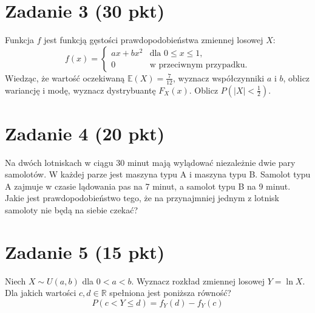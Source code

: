 \documentclass[polish, 10pt]{extarticle}
\begin{document}
\section*{Zadanie 3 (30 pkt)}
Funkcja $f$ jest funkcją gęstości prawdopodobieństwa zmiennej losowej $X$:
\[
f(x) = 
\begin{cases} 
ax + bx^2 & \text{dla } 0 \leq x \leq 1, \\
0 & \text{w przeciwnym przypadku}.
\end{cases}
\]
Wiedząc, że wartość oczekiwaną $\mathbb{E}(X) = \frac{7}{12}$, wyznacz współczynniki $a$ i $b$, oblicz wariancję i modę, wyznacz dystrybuantę $F_X(x)$. Oblicz $P(|X| < \frac{1}{2})$.


\section*{Zadanie 4 (20 pkt)}
Na dwóch lotniskach w ciągu 30 minut mają wylądować niezależnie
dwie pary samolotów. W każdej parze jest maszyna typu A i maszyna typu B.
Samolot typu A zajmuje w czasie lądowania pas na 7 minut, a samolot typu B
na 9 minut. Jakie jest prawdopodobieństwo tego, że na przynajmniej jednym
z lotnisk samoloty nie będą na siebie czekać?

\section*{Zadanie 5 (15 pkt)}
Niech $X \sim U(a, b)$ dla $0 < a < b$. Wyznacz rozkład zmiennej losowej $Y = \ln X$. Dla jakich wartości $c, d \in \mathbb{R}$ spełniona jest poniższa równość?
$$P(c < Y \leq d) = f_Y(d) - f_Y(c)$$
\end{document}
